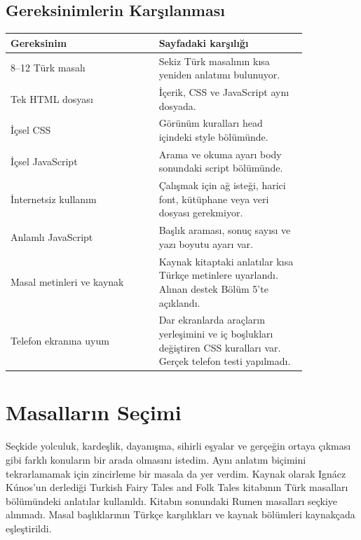 \documentclass[11pt,a4paper]{article}
\begin{document}
\subsection{Gereksinimlerin Karşılanması}
\begin{longtable}{|p{0.42\linewidth}|p{0.42\linewidth}|}
\hline \textbf{Gereksinim} & \textbf{Sayfadaki karşılığı} \\ \hline\endhead
8–12 Türk masalı & Sekiz Türk masalının kısa yeniden anlatımı bulunuyor. \\ \hline
Tek HTML dosyası & İçerik, CSS ve JavaScript aynı dosyada. \\ \hline
İçsel CSS & Görünüm kuralları head içindeki style bölümünde. \\ \hline
İçsel JavaScript & Arama ve okuma ayarı body sonundaki script bölümünde. \\ \hline
İnternetsiz kullanım & Çalışmak için ağ isteği, harici font, kütüphane veya veri dosyası gerekmiyor. \\ \hline
Anlamlı JavaScript & Başlık araması, sonuç sayısı ve yazı boyutu ayarı var. \\ \hline
Masal metinleri ve kaynak & Kaynak kitaptaki anlatılar kısa Türkçe metinlere uyarlandı. Alınan destek Bölüm 5’te açıklandı. \\ \hline
Telefon ekranına uyum & Dar ekranlarda araçların yerleşimini ve iç boşlukları değiştiren CSS kuralları var. Gerçek telefon testi yapılmadı. \\ \hline
\end{longtable}
\newpage
\section{Masalların Seçimi}
Seçkide yolculuk, kardeşlik, dayanışma, sihirli eşyalar ve gerçeğin ortaya çıkması gibi farklı konuların bir arada olmasını istedim. Aynı anlatım biçimini tekrarlamamak için zincirleme bir masala da yer verdim. Kaynak olarak Ignácz Kúnos’un derlediği Turkish Fairy Tales and Folk Tales kitabının Türk masalları bölümündeki anlatılar kullanıldı. Kitabın sonundaki Rumen masalları seçkiye alınmadı. Masal başlıklarının Türkçe karşılıkları ve kaynak bölümleri kaynakçada eşleştirildi.
\end{document}
